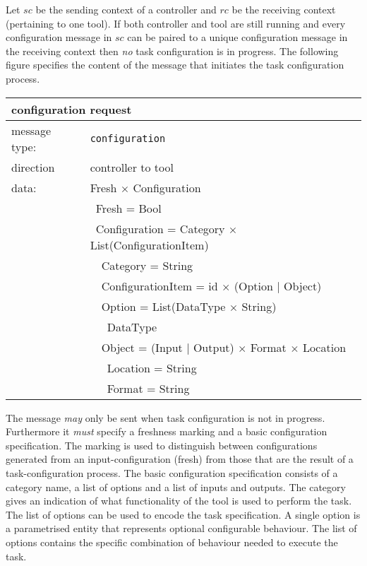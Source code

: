 \documentclass{article}
\newcommand{\msg}[1]{\texttt{#1}}
\begin{document}
   Let $sc$ be the sending context of a controller and $rc$ be the receiving
   context (pertaining to one tool). If both controller and tool are still
   running and every configuration message in $sc$ can be paired to a unique
   configuration message in the receiving context then \emph{no} task
   configuration is in progress. The following figure specifies the content of
   the message that initiates the task configuration process.
   \begin{table}[H]
    \begin{center}
     \begin{tabular}{|ll|}
      \hline
       \multicolumn{2}{|l|}{\textbf{configuration request}} \\
      \hline
       message type:   & \msg{configuration} \\
      \hline
       direction       & controller to tool \\
       data:           & Fresh $\times$ Configuration \\
                       & \ Fresh = Bool \\
                       & \ Configuration = Category $\times$ List(ConfigurationItem) \\
                       & \ \ Category = String \\
                       & \ \ ConfigurationItem = id $\times$ (Option $|$ Object) \\
                       & \ \ Option = List(DataType $\times$ String) \\
                       & \ \ \ DataType \\
                       & \ \ Object = (Input $|$ Output) $\times$ Format $\times$ Location \\
                       & \ \ \ Location = String \\
                       & \ \ \ Format   = String \\
      \hline
     \end{tabular}
     \vspace{-0.3cm}
    \end{center}
   \end{table}

   \noindent The message \emph{may} only be sent when task configuration is not
   in progress.  Furthermore it \emph{must} specify a freshness marking and a
   basic configuration specification.  The marking is used to distinguish
   between configurations generated from an input-configuration (fresh) from
   those that are the result of a task-configuration process.  The basic
   configuration specification consists of a category name, a list of options
   and a list of inputs and outputs. The category gives an indication of what
   functionality of the tool is used to perform the task.  The list of options
   can be used to encode the task specification. A single option is a
   parametrised entity that represents optional configurable behaviour. The
   list of options contains the specific combination of behaviour needed to
   execute the task.
\end{document}
